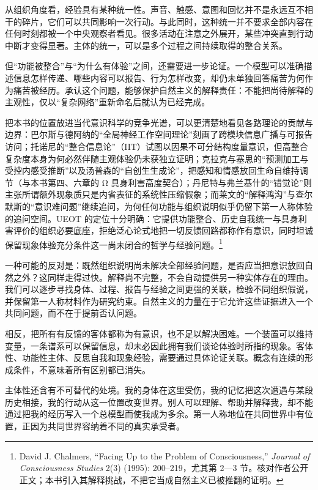 \documentclass[
  11pt,
  oneside]{book}
\begin{document}
从组织角度看，经验具有某种统一性。声音、触感、意图和回忆并不是永远互不相干的碎片，它们可以共同影响一次行动。与此同时，这种统一并不要求全部内容在任何时刻都被一个中央观察者看见。很多活动在注意之外展开，某些冲突直到行动中断才变得显著。主体的统一，可以是多个过程之间持续取得的整合关系。

但``功能被整合''与``为什么有体验''之间，还需要进一步论证。一个模型可以准确描述信息怎样传递、哪些内容可以报告、行为怎样改变，却仍未单独回答痛苦为何作为痛苦被经历。承认这个问题，能够保护自然主义的解释责任：不能把尚待解释的主观性，仅以``复杂网络''重新命名后就认为已经完成。

把本书的位置放进当代意识科学的竞争光谱，可以更清楚地看见各路理论的贡献与边界：巴尔斯与德阿纳的``全局神经工作空间理论''刻画了跨模块信息广播与可报告访问；托诺尼的``整合信息论''（IIT）试图以因果不可分结构度量意识，但高整合复杂度本身为何必然伴随主观体验仍未获独立证明；克拉克与塞思的``预测加工与受控内感受推断''以及汤普森的``自创生生成论''，把感知和情感放回生命自维持调节（与本书第四、六章的 Ω 具身利害高度契合）；丹尼特与弗兰基什的``错觉论''则主张所谓额外现象质只是内省表征的系统性压缩假象；而莱文的``解释鸿沟''与查尔默斯的``意识难问题''继续追问，为何任何功能与组织说明似乎仍留下第一人称体验的追问空间。UEOT 的定位十分明确：它提供功能整合、历史自我统一与具身利害评价的组织必要底座，拒绝泛心论式地把一切反馈回路都称作有意识，同时坦诚保留现象体验充分条件这一尚未闭合的哲学与经验问题。\footnote{\hypertarget{ph-note-52}{}David J. Chalmers, ``Facing Up to the Problem of Consciousness,'' \emph{Journal of Consciousness Studies} 2(3) (1995): 200--219，尤其第 2---3 节。核对作者公开正文；本书引入其解释挑战，不把它当成自然主义已被推翻的证明。}

一种可能的反对是：既然组织说明尚未解决全部经验问题，是否应当把意识放回自然之外？这同样走得过快。解释尚不完整，不会自动提供另一种实体存在的理由。我们可以逐步寻找身体、过程、报告与经验之间更强的关联，检验不同组织假说，并保留第一人称材料作为研究约束。自然主义的力量在于它允许这些证据进入一个共同问题，而不在于提前否认问题。

相反，把所有有反馈的客体都称为有意识，也不足以解决困难。一个装置可以维持变量，一条谱系可以保留信息，却未必因此拥有我们谈论体验时所指的现象。客体性、功能性主体、反思自我和现象经验，需要通过具体论证关联。概念有连续的形成条件，不意味着所有区别都已消失。

主体性还含有不可替代的处境。我的身体在这里受伤，我的记忆把这次遭遇与某段历史相接，我的行动从这一位置改变世界。别人可以理解、帮助并解释我，却不能通过把我的经历写入一个总模型而使我成为多余。第一人称地位在共同世界中有位置，正因为共同世界容纳着不同的真实承受者。
\end{document}
